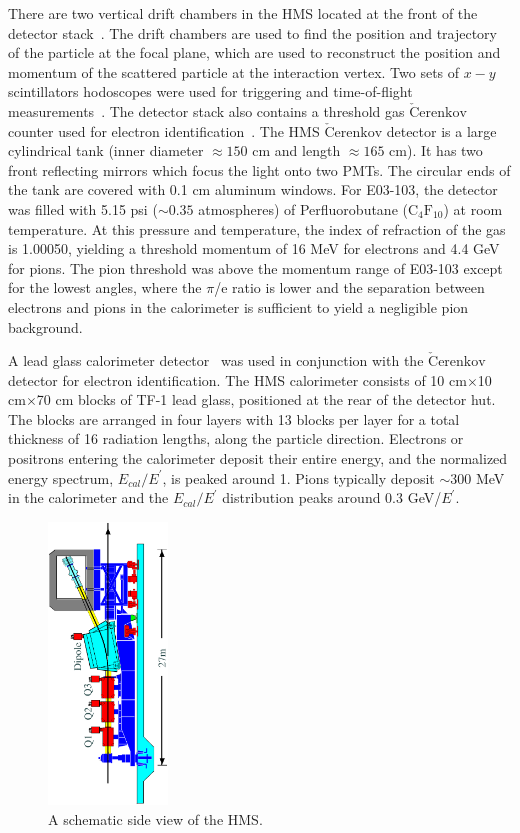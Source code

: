There are two vertical drift chambers in the HMS located at the front of the
detector stack~\cite{baker95}. The drift chambers are used to find the
position and trajectory of the particle at the focal plane, which are used to
reconstruct the position and momentum of the scattered particle at the
interaction vertex. Two sets of $x-y$ scintillators hodoscopes were used for
triggering and time-of-flight measurements~\cite{??}. The detector stack also
contains a threshold gas $\mathrm{\check{C}erenkov}$ counter used for electron
identification~\cite{??}. The HMS $\mathrm{\check{C}erenkov}$ detector is a large
cylindrical tank (inner diameter $\approx 150$ cm and length $\approx 165$
cm). It has two front reflecting mirrors which focus the light onto two PMTs.
The circular ends of the tank are covered with 0.1 cm aluminum windows. For
E03-103, the detector was filled with 5.15 psi ($\sim 0.35$ atmospheres) of
Perfluorobutane ($\mathrm{C_4F_{10}}$) at room temperature. At this pressure
and temperature, the index of refraction of the gas is 1.00050, yielding
a threshold momentum of 16 MeV for electrons and 4.4 GeV for pions. The pion
threshold was above the momentum range of E03-103 except for the lowest
angles, where the $\pi$/e ratio is lower and the separation between electrons
and pions in the calorimeter is sufficient to yield a negligible pion
background.

A lead glass calorimeter detector~\cite{mkrtchyan13} was used in conjunction
with the $\mathrm{\check{C}erenkov}$ detector for electron identification. The
HMS calorimeter consists of 10 cm$\times$10 cm$\times$70 cm blocks of TF-1 lead
glass, positioned at the rear of the detector hut. The blocks are arranged in
four layers with 13 blocks per layer for a total thickness of 16 radiation
lengths, along the particle direction.  Electrons or positrons entering the
calorimeter deposit their entire energy, and the normalized energy spectrum,
$E_{cal}/E^{'}$, is peaked around 1. Pions typically deposit $\sim 300 $ MeV
in the calorimeter and the $E_{cal}/E^{'}$ distribution peaks around 0.3
GeV/$E^{'}$.

\begin{figure}[htb]
\begin{center}
\includegraphics[height=75mm, angle=270]{plots/hmssideview.ps}
\caption [Side view of the HMS] {A schematic side view of the HMS.}
\label{hmsside_fig}
\end{center}
\end{figure}

